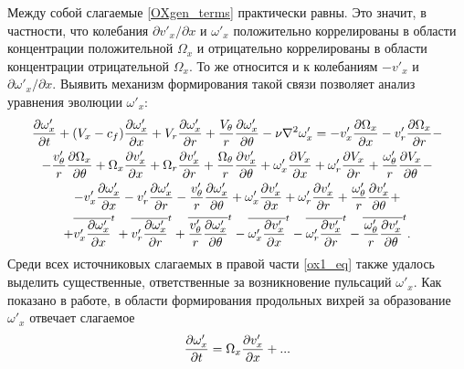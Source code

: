 Между собой слагаемые \eqref{OXgen_terms} практически равны. Это значит, в частности, что колебания $\partial v'_x / \partial x$ и $\omega'_x$ положительно коррелированы в области концентрации положительной $\Omega_x$ и отрицательно коррелированы в области концентрации отрицательной $\Omega_x$. То же относится и к колебаниям $-v'_x$ и $\partial \omega'_x / \partial x$. Выявить механизм формирования такой связи позволяет анализ уравнения эволюции $\omega'_x$:
\begin{multline}\label{ox1_eq}
\frac{\partial \omega'_x}{\partial t} + (V_x - c_f)\frac{\partial \omega'_x}{\partial x} + V_r \frac{\partial \omega_x'}{\partial r} + \frac{V_\theta}{r} \frac{\partial \omega'_x}{\partial \theta} 
- \nu\nabla^2\omega'_x = - v'_x \frac{\partial \Omega_x}{\partial x} - v'_r \frac{\partial \Omega_x}{\partial r} - \\ - \frac{v'_\theta}{r} \frac{\partial \Omega_x}{\partial \theta} 
+ \Omega_x \frac{\partial v'_x}{\partial x} + \Omega_r \frac{\partial v'_x}{\partial r} + \frac{\Omega_\theta}{r} \frac{\partial v'_x}{\partial \theta}
+ \omega'_x \frac{\partial V_x}{\partial x} + \omega'_r \frac{\partial V_x}{\partial r} + \frac{\omega'_\theta}{r} \frac{\partial V_x}{\partial \theta} - \\ 
- v'_x \frac{\partial \omega'_x}{\partial x} - v'_r \frac{\partial \omega'_x}{\partial r} - \frac{v'_\theta}{r} \frac{\partial \omega'_x}{\partial \theta} 
+ \omega'_x \frac{\partial v'_x}{\partial x} + \omega'_r \frac{\partial v'_x}{\partial r} + \frac{\omega'_\theta}{r} \frac{\partial v'_x}{\partial \theta} + \\
+ \overline{v'_x \frac{\partial \omega'_x}{\partial x}}^t + \overline{v'_r \frac{\partial \omega'_x}{\partial r}}^t + \overline{\frac{v'_\theta}{r} \frac{\partial \omega'_x}{\partial \theta}}^t
- \overline{\omega'_x \frac{\partial v'_x}{\partial x}}^t - \overline{\omega'_r \frac{\partial v'_x}{\partial r}}^t - \overline{\frac{\omega'_\theta}{r} \frac{\partial v'_x}{\partial \theta}}^t.
\end{multline}
Среди всех источниковых слагаемых в правой части \eqref{ox1_eq} также удалось выделить существенные, ответственные за возникновение пульсаций $\omega'_x$. Как показано в работе, в области формирования продольных вихрей за образование $\omega'_x$ отвечает слагаемое
\begin{equation}\label{ox1gen_main_terms}
\frac{\partial \omega'_x}{\partial t} = \Omega_x \frac {\partial v'_x}{\partial x} + ...
\end{equation}
